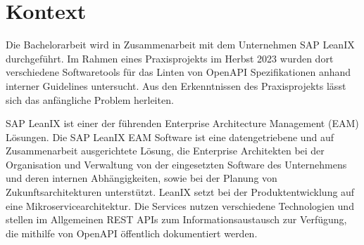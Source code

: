 \section{Kontext}
Die Bachelorarbeit wird in Zusammenarbeit mit dem Unternehmen SAP LeanIX durchgeführt. Im Rahmen eines Praxisprojekts im Herbst 2023 wurden dort verschiedene Softwaretools für das Linten von OpenAPI Spezifikationen anhand interner Guidelines untersucht. Aus den Erkenntnissen des Praxisprojekts lässt sich das anfängliche Problem herleiten.

SAP LeanIX ist einer der führenden Enterprise Architecture Management (EAM) Lösungen. Die SAP LeanIX EAM Software ist eine datengetriebene und auf Zusammenarbeit ausgerichtete Lösung, die Enterprise Architekten bei der Organisation und Verwaltung von der eingesetzten Software des Unternehmens und deren internen Abhängigkeiten, sowie bei der Planung von Zukunftsarchitekturen unterstützt. 
LeanIX setzt bei der Produktentwicklung auf eine Mikroservicearchitektur. Die Services nutzen verschiedene Technologien und stellen im Allgemeinen REST APIs zum Informationsaustausch zur Verfügung, die mithilfe von OpenAPI öffentlich dokumentiert werden.


